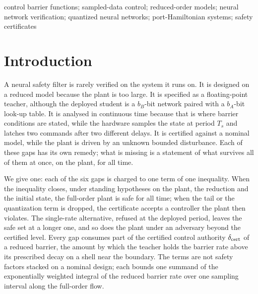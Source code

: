 \begin{keywords}
control barrier functions; sampled-data control; reduced-order models; neural network verification; quantized neural networks; port-Hamiltonian systems; safety certificates
\end{keywords}

\section{Introduction}
\label{sec:intro}

A neural safety filter is rarely verified on the system it runs on. It is designed on a reduced model because the plant is too large. It is specified as a floating-point teacher, although the deployed student is a $b_B$-bit network paired with a $b_A$-bit look-up table. It is analysed in continuous time because that is where barrier conditions are stated, while the hardware samples the state at period $T_s$ and latches two commands after two different delays. It is certified against a nominal model, while the plant is driven by an unknown bounded disturbance. Each of these gaps has its own remedy; what is missing is a statement of what survives all of them at once, on the plant, for all time.

We give one: each of the six gaps is charged to one term of one inequality. When the inequality closes, under standing hypotheses on the plant, the reduction and the initial state, the full-order plant is safe for all time; when the tail or the quantization term is dropped, the certificate accepts a controller the plant then violates. The single-rate alternative, refused at the deployed period, leaves the safe set at a longer one, and so does the plant under an adversary beyond the certified level. Every gap consumes part of the certified control authority $\delta_{\mathrm{cert}}$ of a reduced barrier, the amount by which the teacher holds the barrier rate above its prescribed decay on a shell near the boundary. The terms are not safety factors stacked on a nominal design; each bounds one summand of the exponentially weighted integral of the reduced barrier rate over one sampling interval along the full-order flow.

